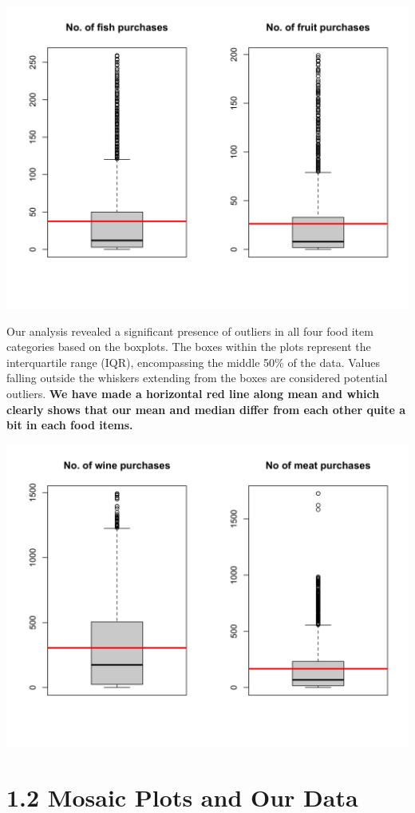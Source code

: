 \documentclass[
  a4paperpaper,
  DIV=11,
  numbers=noendperiod]{scrartcl}
\begin{document}
\includegraphics{Report_files/figure-pdf/unnamed-chunk-3-1.png}

Our analysis revealed a significant presence of outliers in all four
food item categories based on the boxplots. The boxes within the plots
represent the interquartile range (IQR), encompassing the middle 50\% of
the data. Values falling outside the whiskers extending from the boxes
are considered potential outliers. \textbf{We have made a horizontal red
line along mean and which clearly shows that our mean and median differ
from each other quite a bit in each food items.}

\includegraphics{Report_files/figure-pdf/unnamed-chunk-4-1.png}

\hypertarget{mosaic-plots-and-our-data}{%
\section{1.2 Mosaic Plots and Our
Data}\label{mosaic-plots-and-our-data}}
\end{document}
